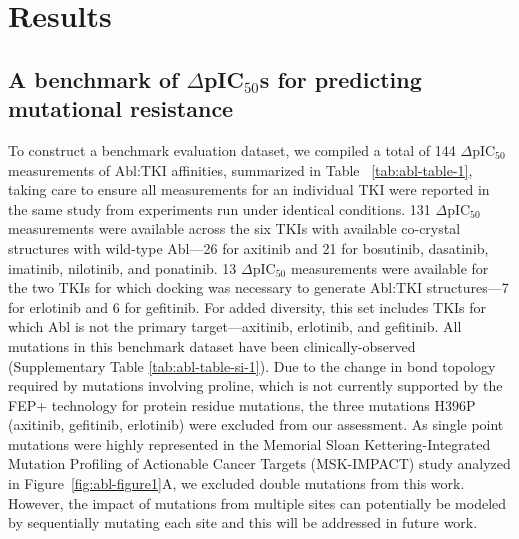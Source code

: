 \documentclass[phd,tocprelim]{cornell}
\begin{document}
\section{Results}
\subsection{A benchmark of $\Delta$pIC$_{50}$s for predicting mutational resistance} 
To construct a benchmark evaluation dataset, we compiled a total of 144  $\Delta$pIC$_{50}$ measurements of Abl:TKI affinities, summarized in Table ~\ref{tab:abl-table-1}, taking care to ensure all measurements for an individual TKI were reported in the same study from experiments run under identical conditions.
131 $\Delta$pIC$_{50}$ measurements were available across the six TKIs with available co-crystal structures with wild-type Abl---26 for axitinib and 21 for bosutinib, dasatinib, imatinib, nilotinib, and ponatinib.
13 $\Delta$pIC$_{50}$ measurements were available for the two TKIs for which docking was necessary to generate Abl:TKI structures---7 for erlotinib and 6 for gefitinib. 
For added diversity, this set includes TKIs for which Abl is not the primary target---axitinib, erlotinib, and gefitinib.
All mutations in this benchmark dataset have been clinically-observed (Supplementary Table \ref{tab:abl-table-si-1}). Due to the change in bond topology required by mutations involving proline, which is not currently supported by the FEP+ technology for protein residue mutations, the three mutations H396P (axitinib, gefitinib, erlotinib) were excluded from our assessment. As single point mutations were highly represented in the Memorial Sloan
Kettering-Integrated Mutation Profiling of Actionable Cancer Targets (MSK-IMPACT) study analyzed in Figure~\ref{fig:abl-figure1}A, we excluded double mutations from this work. However, the impact of mutations from multiple sites can potentially be modeled by sequentially mutating each site and this will be addressed in future work.
\end{document}
